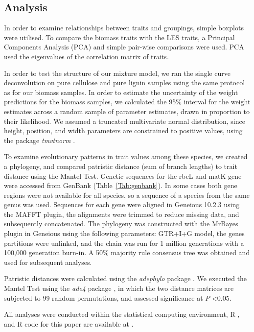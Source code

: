 \documentclass{article}
\begin{document}
\subsection{Analysis}
In order to examine relationships between traits and groupings, simple boxplots were utilised. To compare the biomass traits with the LES traits, a Principal Components Analysis (PCA) and simple pair-wise comparisons were used. PCA used the eigenvalues of the correlation matrix of traits. 

In order to test the structure of our mixture model, we ran the single curve deconvolution on pure cellulose and pure lignin samples using the same protocol as for our biomass samples. In order to estimate the uncertainty of the weight predictions for the biomass samples, we calculated the 95\% interval for the weight estimates across a random sample of parameter estimates, drawn in proportion to their likelihood. We assumed a truncated multivariate normal distribution, since height, position, and width parameters are constrained to positive values, using the package \textit{tmvtnorm} \citep{tmvtnorm}. 

To examine evolutionary patterns in trait values among these species, we created a phylogeny, and compared patristic distance (sum of branch lengths) to trait distance using the Mantel Test. Genetic sequences for the rbcL and matK gene were accessed from GenBank (Table~\ref{Tab:genbank}). In some cases both gene regions were not available for all species, so a sequence of a species from the same genus was used. Sequences for each gene were aligned in Geneious 10.2.3 \citep{kearse2012} using the MAFFT \citep{katoh2013} plugin, the alignments were trimmed to reduce missing data, and subsequently concatenated. The phylogeny was constructed with the MrBayes \citep{ronquist2012} plugin in Geneious using the following parameters: GTR+I+G model, the genes partitions were unlinked, and the chain was run for 1 million generations with a 100,000 generation burn-in. A 50\% majority rule consensus tree was obtained and used for subsequent analyses. 

Patristic distances were calculated using the \textit{adephylo} package \citep{adephylo}. We executed the Mantel Test using the \textit{ade4} package \citep{ade4}, in which the two distance matrices are subjected to 99 random permutations, and assessed significance at $P$ \textless 0.05. 

All analyses were conducted within the statistical computing environment, R \citep{R}, and R code for this paper are available at \citep{biomass_traits}.
\end{document}

